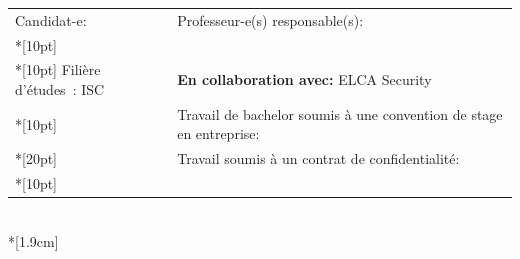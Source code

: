 \begin{spacing}{0.956}
\begin{center}
{
	\begin{tabular*}{16cm}{p{7.59cm} p{7.58cm}}
		\small Candidat-e:					&	\small Professeur-e(s) responsable(s):\\*[10pt]
		\small\textbf{\textsc{\Author}}		&	\small\textbf{\textsc{\Professor}}\\*[10pt]
		\footnotesize  Filière d’études : ISC	&	\footnotesize  \textbf{En collaboration avec:} ELCA Security\\*[10pt]
		\footnotesize  {} & \footnotesize  Travail de bachelor soumis à une convention de stage en entreprise: \Convention\\*[20pt]
		\footnotesize  {} & \footnotesize  Travail soumis à un contrat de confidentialité: \Confidentiel\\*[10pt]
	\end{tabular*}\\*[1.9cm]
}
	
\end{center}
\end{spacing}
